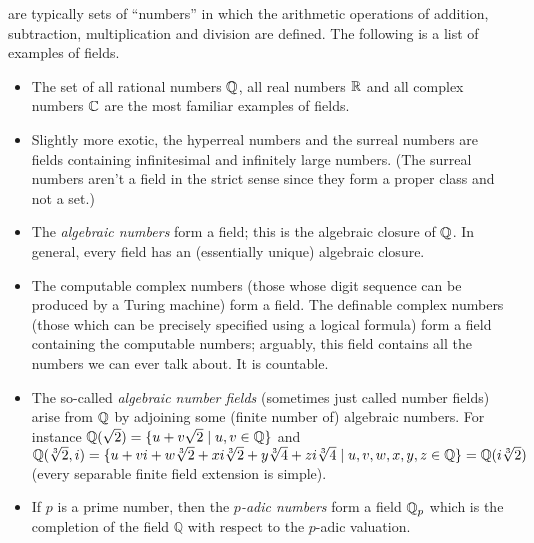 \documentclass[12pt]{article}
\begin{document}

 are typically sets of ``numbers'' in which the arithmetic
  operations of addition, subtraction, multiplication and division are
  defined. The following is a list of examples of fields.

\begin{itemize}

\item The set of all rational numbers $\Bbb{Q}$, all real numbers $\Bbb{R}$ and all
complex numbers $\Bbb{C}$ are the most familiar examples of fields.

\item Slightly more exotic, the hyperreal numbers and the surreal
numbers are fields containing infinitesimal and infinitely large
numbers. (The surreal numbers aren't a field in the strict sense since
they form a proper class and not a set.)

\item The {\em algebraic numbers} form a field; this is the algebraic
closure of $\Bbb{Q}$. In general, every field has an (essentially
unique) algebraic closure.

\item The computable complex numbers (those whose digit sequence can be produced by a Turing machine) form a field. The definable complex numbers (those which can be
precisely specified using a logical formula) form a field containing the computable numbers; arguably, this
field contains all the numbers we can ever talk about.  It is countable.

\item The so-called {\em algebraic number fields} (sometimes just called number fields) arise from $\Bbb{Q}$ by adjoining some (finite number of) algebraic numbers. For instance $\Bbb{Q}(\sqrt{2}) = \{u +
v\sqrt{2} \mid u,v\in\Bbb{Q}\}$ and $\Bbb{Q}(\sqrt[3]{2},i) = \{u + vi
+ w\sqrt[3]{2} + xi\sqrt[3]{2} + y \sqrt[3]{4} + zi \sqrt[3]{4} \mid
u,v,w,x,y,z\in\Bbb{Q}\} = \mathbb{Q}(i\sqrt[3]{2})$ (every separable finite field extension is simple).

\item If $p$ is a prime number, then the $p${\em -adic numbers} form a
field $\Bbb{Q}_p$ which is the completion of the field $\mathbb{Q}$ with respect to the $p$-adic valuation. 


\end{itemize}
\end{document}
